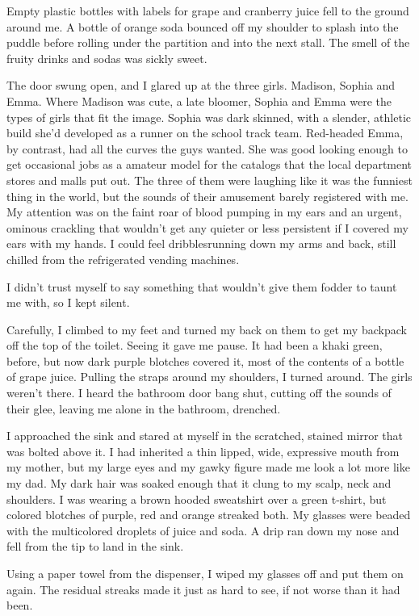 Empty plastic bottles with labels for grape and cranberry juice fell to the ground around me. A bottle of orange soda bounced off my shoulder to splash into the puddle before rolling under the partition and into the next stall. The smell of the fruity drinks and sodas was sickly sweet.

The door swung open, and I glared up at the three girls. Madison, Sophia and Emma. Where Madison was cute, a late bloomer, Sophia and Emma were the types of girls that fit the  image. Sophia was dark skinned, with a slender, athletic build she'd developed as a runner on the school track team. Red-headed Emma, by contrast, had all the curves the guys wanted. She was good looking enough to get occasional jobs as a amateur model for the catalogs that the local department stores and malls put out. The three of them were laughing like it was the funniest thing in the world, but the sounds of their amusement barely registered with me. My attention was on the faint roar of blood pumping in my ears and an urgent, ominous crackling  that wouldn't get any quieter or less persistent if I covered my ears with my hands. I could feel dribblesrunning down my arms and back, still chilled from the refrigerated vending machines.

I didn't trust myself to say something that wouldn't give them fodder to taunt me with, so I kept silent.

Carefully, I climbed to my feet and turned my back on them to get my backpack off the top of the toilet. Seeing it gave me pause. It had been a khaki green, before, but now dark purple blotches covered it, most of the contents of a bottle of grape juice. Pulling the straps around my shoulders, I turned around. The girls weren't there. I heard the bathroom door bang shut, cutting off the sounds of their glee, leaving me alone in the bathroom, drenched.

I approached the sink and stared at myself in the scratched, stained mirror that was bolted above it. I had inherited a thin lipped, wide, expressive mouth from my mother, but my large eyes and my gawky figure made me look a lot more like my dad. My dark hair was soaked enough that it clung to my scalp, neck and shoulders. I was wearing a brown hooded sweatshirt over a green t-shirt, but colored blotches of purple, red and orange streaked both. My glasses were beaded with the multicolored droplets of juice and soda. A drip ran down my nose and fell from the tip to land in the sink.

Using a paper towel from the dispenser, I wiped my glasses off and put them on again. The residual streaks made it just as hard to see, if not worse than it had been.

